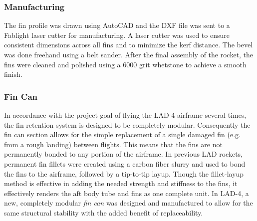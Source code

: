 \subsubsection*{Manufacturing}
The fin profile was drawn using AutoCAD and the DXF file was sent to a Fablight laser cutter for manufacturing. A laser cutter was used to ensure consistent dimensions across all fins and to minimize the kerf distance. The bevel was done freehand using a belt sander. After the final assembly of the rocket, the fins were cleaned and polished using a 6000 grit whetstone to achieve a smooth finish.
\subsubsection{Fin Can}
In accordance with the project goal of flying the LAD-4 airframe several times, the fin retention system is designed to be completely modular. Consequently the fin can section allows for the simple replacement of a single damaged fin (e.g. from a rough landing) between flights. This means that the fins are not permanently bonded to any portion of the airframe. In previous LAD rockets, permanent fin fillets were created using a carbon fiber slurry and used to bond the fins to the airframe, followed by a tip-to-tip layup. Though the fillet-layup method is effective in adding the needed strength and stiffness to the fins, it effectively renders the aft body tube and fins as one complete unit. In LAD-4, a new, completely modular \textit{fin can} was designed and manufactured to allow for the same structural stability with the added benefit of replaceability. 
